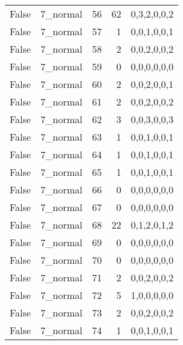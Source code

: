 \begin{tabular}{llrrl}
 False           & 7\_normal            &            56 &                    62 & 0,3,2,0,0,2   \\
 False           & 7\_normal            &            57 &                     1 & 0,0,1,0,0,1   \\
 False           & 7\_normal            &            58 &                     2 & 0,0,2,0,0,2   \\
 False           & 7\_normal            &            59 &                     0 & 0,0,0,0,0,0   \\
 False           & 7\_normal            &            60 &                     2 & 0,0,2,0,0,1   \\
 False           & 7\_normal            &            61 &                     2 & 0,0,2,0,0,2   \\
 False           & 7\_normal            &            62 &                     3 & 0,0,3,0,0,3   \\
 False           & 7\_normal            &            63 &                     1 & 0,0,1,0,0,1   \\
 False           & 7\_normal            &            64 &                     1 & 0,0,1,0,0,1   \\
 False           & 7\_normal            &            65 &                     1 & 0,0,1,0,0,1   \\
 False           & 7\_normal            &            66 &                     0 & 0,0,0,0,0,0   \\
 False           & 7\_normal            &            67 &                     0 & 0,0,0,0,0,0   \\
 False           & 7\_normal            &            68 &                    22 & 0,1,2,0,1,2   \\
 False           & 7\_normal            &            69 &                     0 & 0,0,0,0,0,0   \\
 False           & 7\_normal            &            70 &                     0 & 0,0,0,0,0,0   \\
 False           & 7\_normal            &            71 &                     2 & 0,0,2,0,0,2   \\
 False           & 7\_normal            &            72 &                     5 & 1,0,0,0,0,0   \\
 False           & 7\_normal            &            73 &                     2 & 0,0,2,0,0,2   \\
 False           & 7\_normal            &            74 &                     1 & 0,0,1,0,0,1   \\

\end{tabular}
